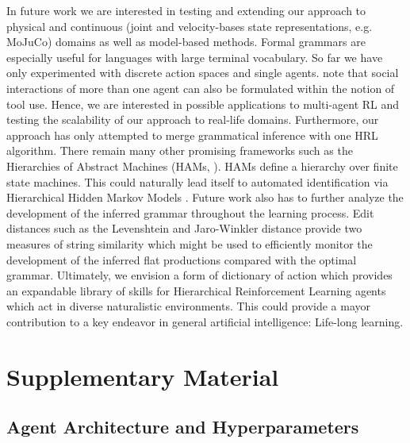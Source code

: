 \documentclass[colorinlistoftodos]{article}
\theoremstyle{definition}
\begin{document}
In future work we are interested in testing and extending our approach to physical and continuous (joint and velocity-bases state representations, e.g. MoJuCo) domains as well as model-based methods. Formal grammars are especially useful for languages with large terminal vocabulary. So far we have only experimented with discrete action spaces and single agents. \citet{Pastra_2012} note that social interactions of more than one agent can also be formulated within the notion of tool use. Hence, we are interested in possible applications to multi-agent RL  and testing the scalability of our approach to real-life domains.
%
Furthermore, our approach has only attempted to merge grammatical inference with one HRL algorithm. There remain many other promising frameworks such as the Hierarchies of Abstract Machines (HAMs, \citep{Parr_1998a,Parr_1998b}). HAMs define a hierarchy over finite state machines. This could naturally lead itself to automated identification via Hierarchical Hidden Markov Models \citep{Fine_1998}.
%
Future work also has to further analyze the development of the inferred grammar throughout the learning process. Edit distances such as the Levenshtein and Jaro-Winkler distance provide two measures of string similarity which might be used to efficiently monitor the development of the inferred flat productions compared with the optimal grammar.
%
Ultimately, we envision a form of dictionary of action which provides an expandable library of skills for Hierarchical Reinforcement Learning agents which act in diverse naturalistic environments. This could provide a mayor contribution to a key endeavor in general artificial intelligence: Life-long learning.

\newpage
\listoftodos

\setlength{\bibsep}{3pt plus 0.3ex}

{\tiny }

\section*{Supplementary Material}

\subsection*{Agent Architecture and Hyperparameters}
\end{document}
